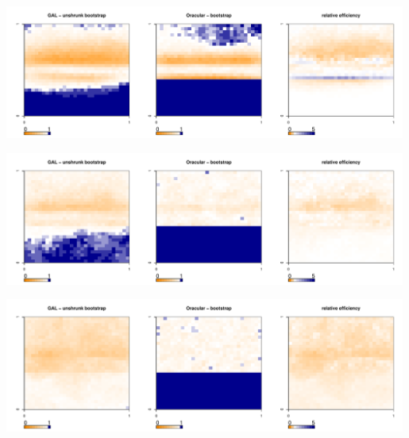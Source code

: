 \documentclass[authoryear, review, 11pt]{elsarticle}
\begin{document}
	\begin{center}
		\includegraphics[width=0.99\textwidth]{../../figures/X1-28-16.pdf}
		\label{fig:coveragemap16}
	\end{center}
        
	\begin{center}
		\includegraphics[width=0.99\textwidth]{../../figures/X1-28-17.pdf}
		\label{fig:coveragemap17}
	\end{center}
	
	\begin{center}
		\includegraphics[width=0.99\textwidth]{../../figures/X1-28-18.pdf}
		\label{fig:coveragemap18}
	\end{center}
	
\end{document}
